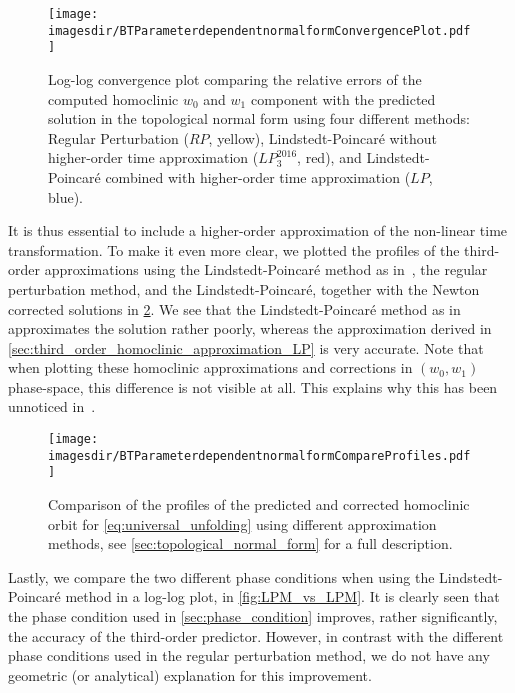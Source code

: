 \begin{figure}
    \texttt{[image: \\imagesdir/BTParameterdependentnormalformConvergencePlot.pdf]}
    \caption{Log-log convergence plot comparing the relative errors of the computed
        homoclinic $w_0$ and $w_1$ component with the predicted solution in the
        topological normal form using four different methods: Regular
        Perturbation ($RP$, yellow), Lindstedt-Poincar\'e without higher-order time
        approximation ($LP_3^{2016}$, red), and Lindstedt-Poincar\'e combined
        with higher-order time approximation ($LP$, blue).}
    \label{fig:RP_vs_LP2016_vs_LP}
\end{figure}

It is thus essential to include a higher-order approximation of the non-linear
time transformation. To make it even more clear, we plotted the profiles of the
third-order approximations using the Lindstedt-Poincar\'e method as
in~\cite{Al-Hdaibat2016}, the regular perturbation method, and the
Lindstedt-Poincar\'e, together with the Newton corrected solutions in
\cref{fig:RP_vs_LP2016_vs_LP_profiles}. We see that the Lindstedt-Poincar\'e
method as in~\cite{Al-Hdaibat2016} approximates the solution rather poorly,
whereas the approximation derived in
\cref{sec:third_order_homoclinic_approximation_LP} is very accurate. Note that
when plotting these homoclinic approximations and corrections in $(w_0,w_1)$
phase-space, this difference is not visible at all. This explains why this has been
unnoticed in~\cite{Al-Hdaibat2016}.

\begin{figure}[!ht]
\centering
\texttt{[image: \\imagesdir/BTParameterdependentnormalformCompareProfiles.pdf]}
\caption{Comparison of the profiles of the predicted and corrected
    homoclinic orbit for \cref{eq:universal_unfolding} using different
    approximation methods, see
\cref{sec:topological_normal_form} for a full description.}
\label{fig:RP_vs_LP2016_vs_LP_profiles}
\end{figure}

Lastly, we compare the two different phase conditions when using the
Lindstedt-Poincar\'e method in a log-log plot, in \cref{fig:LPM_vs_LPM}. It is
clearly seen that the phase condition used in \cref{sec:phase_condition}
improves, rather significantly, the accuracy of the third-order predictor.
However, in contrast with the different phase conditions used in the regular
perturbation method, we do not have any geometric (or analytical) explanation
for this improvement.

